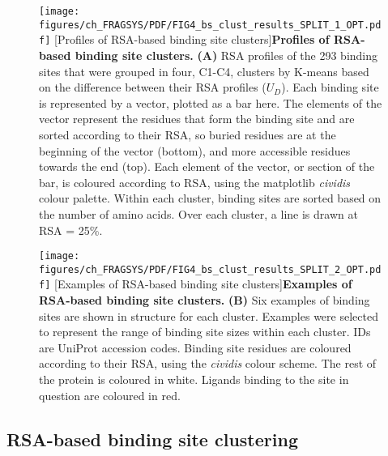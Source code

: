\begin{figure}[hb!]
    \centering
    \texttt{[image: figures/ch\_FRAGSYS/PDF/FIG4\_bs\_clust\_results\_SPLIT\_1\_OPT.pdf]}
    [Profiles of RSA-based binding site clusters]{\textbf{Profiles of RSA-based binding site clusters.} \textbf{(A)} RSA profiles of the 293 binding sites that were grouped in four, C1-C4, clusters by K-means based on the difference between their RSA profiles ($U_{D}$). Each binding site is represented by a vector, plotted as a bar here. The elements of the vector represent the residues that form the binding site and are sorted according to their RSA, so buried residues are at the beginning of the vector (bottom), and more accessible residues towards the end (top). Each element of the vector, or section of the bar, is coloured according to RSA, using the matplotlib  \textit{cividis} colour palette. Within each cluster, binding sites are sorted based on the number of amino acids. Over each cluster, a line is drawn at RSA = 25\%.}
\label{fig:bss_clust_profiles}
\end{figure}

\begin{figure}[ht!]
    \centering
    \texttt{[image: figures/ch\_FRAGSYS/PDF/FIG4\_bs\_clust\_results\_SPLIT\_2\_OPT.pdf]}
    [Examples of RSA-based binding site clusters]{\textbf{Examples of RSA-based binding site clusters.} \textbf{(B)} Six examples of binding sites are shown in structure for each cluster. Examples were selected to represent the range of binding site sizes within each cluster. IDs are UniProt accession codes. Binding site residues are coloured according to their RSA, using the \textit{cividis} colour scheme. The rest of the protein is coloured in white. Ligands binding to the site in question are coloured in red.}
\label{fig:bss_clusts_examples}
\end{figure}

\subsection{RSA-based binding site clustering}

